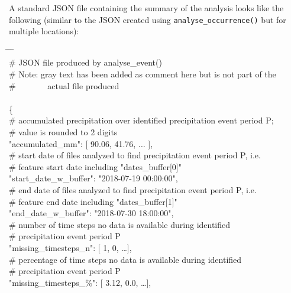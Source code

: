 \documentclass[10pt,a4paper,titlepage,parskip]{scrartcl}
\newenvironment{ttfont}{\fontfamily{\ttdefault}\selectfont}{\par}
\newcommand{\GRAU}[1]{\textcolor{ufzgray2}{#1}}
\begin{document}
A standard JSON file containing the summary of the analysis looks like the following (similar to the JSON created using \texttt{analyse\_occurrence()} but for multiple locations):
\begin{framed}
	\vspace*{-1.2cm}
	\begin{ttfont}
		\begin{tabbing}
			\hspace{0.5cm} \= \hspace{0.5cm} \= \hspace{0.5cm} \= \kill \\[4pt]
			\GRAU{\# JSON file produced by analyse\_event()}\\
			\GRAU{\# Note: gray text has been added as comment here but is not part of the }\\
			\GRAU{\# \ \ \ \ \ \ \ actual file produced}\\
			\\
			\{ \\
			\> \GRAU{\# accumulated precipitation over identified precipitation event period P;}\\
			\> \GRAU{\# value is rounded to 2 digits}\\
			\> "accumulated\_mm": [ 90.06, 41.76, $\ldots$ ],  \\
			\> \GRAU{\# start date of files analyzed to find precipitation event period P, i.e.}\\
			\> \GRAU{\# feature start date including "dates\_buffer[0]"}\\
			\> "start\_date\_w\_buffer": "2018-07-19 00:00:00",  \\
			\> \GRAU{\# end date of files analyzed to find precipitation event period P, i.e.}\\
			\> \GRAU{\# feature end date including "dates\_buffer[1]"}\\
			\> "end\_date\_w\_buffer": "2018-07-30 18:00:00",  \\
			\> \GRAU{\# number of time steps no data is available during identified }\\
			\> \GRAU{\# precipitation event period P}\\
			\> "missing\_timesteps\_n": [ 1, 0, \ldots ],  \\
			\> \GRAU{\# percentage of time steps no data is available during identified }\\
			\> \GRAU{\# precipitation event period P}\\
			\> "missing\_timesteps\_\%": [ 3.12, 0.0, \ldots ],  \\

\end{tabbing}
\end{ttfont}
\end{framed}
\end{document}
